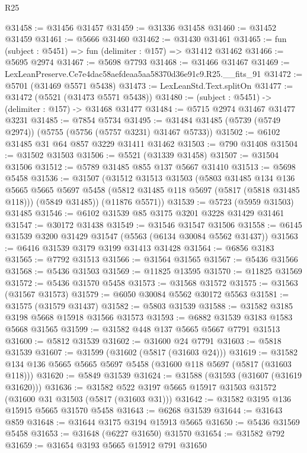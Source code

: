 \begin{lexlean}{R25}
\begin{coremodule}
@31458 := @31456 @31457
@31459 := @31336 @31458
@31460 := @31452 @31459
@31461 := @5666 @31460
@31462 := @31430 @31461
@31465 := fun (subject : @5451) => fun (delimiter : @157) => @31412 @31462
@31466 := @5695 @2974
@31467 := @5698 @7793
@31468 := @31466 @31467
@31469 := LexLeanPreserve.Ce7e4dac58aefdeaa5aa58370d36e91c9.R25.__fits_91
@31472 := @5701 (@31469 @5571 @5438)
@31473 := LexLeanStd.Text.splitOn
@31477 := @31472 (@5521 (@31473 @5571 @5438))
@31480 := (subject : @5451) -> (delimiter : @157) -> @31468 @31477
@31484 := @5715 @2974 @31467 @31477 @3231
@31485 := @7854 @5734
@31495 := @31484 @31485 (@5739 (@5749 @2974)) (@5755 (@5756 (@5757 @3231) @31467 @5733))
@31502 := @6102 @31485 @31 @64 @857 @3229 @31411 @31462
@31503 := @790 @31408
@31504 := @31502 @31503
@31506 := @5521 (@31339 @31458)
@31507 := @31504 @31506
@31512 := @5789 @31485 @855 @137 @5667 @31410
@31513 := @5698 @5458
@31536 := @31507
    (@31512
      @31513
      @31503
      (@5803
        @31485
        @134
        @136
        @5665
        @5665
        @5697
        @5458
        (@5812 @31485 @118 @5697 (@5817 (@5818 @31485 @118)))
        (@5849 @31485))
      (@11876 @5571))
@31539 := @5723 (@5959 @31503) @31485
@31546 := @6102 @31539 @85 @3175 @3201 @3228 @31429 @31461
@31547 := @30172 @31438
@31549 := @31546 @31547 @31506
@31558 := @6145 @31539 @3200 @31429 @31547 (@5563 (@6134 @30084 @5562 @31437))
@31563 := @6416 @31539 @3179 @3199 @31413 @31428
@31564 := @6856 @3183
@31565 := @7792 @31513
@31566 := @31564 @31565
@31567 := @5436 @31566
@31568 := @5436 @31503
@31569 := @11825 @13595
@31570 := @11825 @31569
@31572 := @5436 @31570 @5458
@31573 := @31568 @31572
@31575 := @31563 (@31567 @31573)
@31579 := @6050 @30084 @5562 @30172 @5563
@31581 := @31575 (@31579 @31437)
@31582 := @5803 @31539
@31588 := @31582 @3185 @3198 @5668 @15918 @31566 @31573
@31593 := @6882 @31539 @3183 @1583 @5668 @31565
@31599 := @31582 @448 @137 @5665 @5667 @7791 @31513
@31600 := @5812 @31539
@31602 := @31600 @24 @7791
@31603 := @5818 @31539
@31607 := @31599 (@31602 (@5817 (@31603 @24)))
@31619 := @31582 @134 @136 @5665 @5665 @5697 @5458 (@31600 @118 @5697 (@5817 (@31603 @118)))
@31620 := @5849 @31539
@31624 := @31588 (@31593 (@31607 (@31619 @31620)))
@31636 := @31582 @522 @3197 @5665 @15917 @31503 @31572 (@31600 @31 @31503 (@5817 (@31603 @31)))
@31642 := @31582 @3195 @136 @15915 @5665 @31570 @5458
@31643 := @6268 @31539
@31644 := @31643 @859
@31648 := @31644 @3175 @3194 @15913 @5665
@31650 := @5436 @31569 @5458
@31653 := @31648 (@6227 @31650) @31570
@31654 := @31582 @792
@31659 := @31654 @3193 @5665 @15912 @791 @31650

\end{coremodule}
\end{lexlean}
